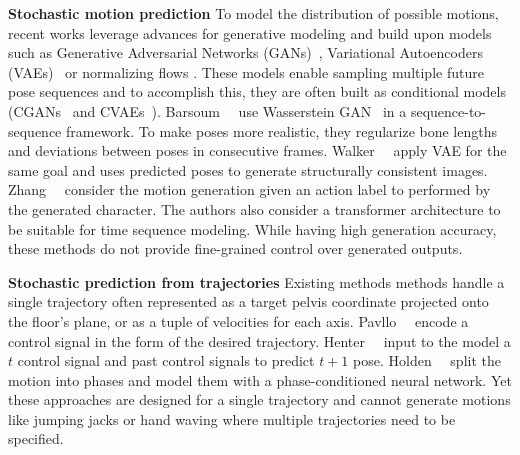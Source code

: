 \documentclass[10pt,twocolumn,letterpaper]{article}
\renewcommand{\paragraph}[1]{\noindent\textbf{#1}\enskip}
\begin{document}
\paragraph{Stochastic motion prediction} To model the distribution of possible motions, recent works \cite{yan2018mt, walker2017pose, harvey2018recurrent, lin2018human, hernandez2019human, aliakbarian2019contextually, yuan2020dlow, kundu2019bihmp, kaufmann2020convolutional, jang2020constructing} leverage advances for generative modeling and build upon models such as Generative Adversarial Networks (GANs)~\cite{goodfellow2014generative}, Variational Autoencoders (VAEs)~\cite{kingma2013auto} or normalizing flows \cite{rezende2015variational}. These models enable sampling multiple future pose sequences and to accomplish this, they are often built as conditional models (CGANs~\cite{goodfellow2014generative} and CVAEs~\cite{kingma2013auto}). Barsoum~\etal~\cite{barsoum2018hp} use Wasserstein GAN~\cite{arjovsky2017wasserstein} in a sequence-to-sequence framework. To make poses more realistic, they regularize bone lengths and deviations between poses in consecutive frames. Walker~\etal~\cite{walker2017pose} apply VAE for the same goal and uses predicted poses to generate structurally consistent images.  Zhang~\etal~\cite{zhang2021learning} consider the motion generation given an action label to performed by the generated character. The authors also consider a transformer architecture to be suitable for time sequence modeling. While having high generation accuracy, these methods do not provide fine-grained control over generated outputs.

\paragraph{Stochastic prediction from trajectories} Existing methods \cite{pavllo2018quaternet,pavllo20193d,pavllo2019modeling,henter2020moglow,holden2017phase, chen2020dynamic,starke2019neural,zhang2018mode,dvorovzvnak2020monster} methods handle a single trajectory often represented as a target pelvis coordinate projected onto the floor's plane, or as a tuple of velocities for each axis. Pavllo~\etal~\cite{pavllo2018quaternet} encode a control signal in the form of the desired trajectory. Henter~\etal~\cite{henter2020moglow} input to the model a $t$ control signal and past control signals to predict $t+1$ pose. Holden~\etal~\cite{holden2017phase} split the motion into phases and model them with a phase-conditioned neural network. Yet these approaches are designed for a single trajectory and cannot generate motions like jumping jacks or hand waving where multiple trajectories need to be specified.
\end{document}
